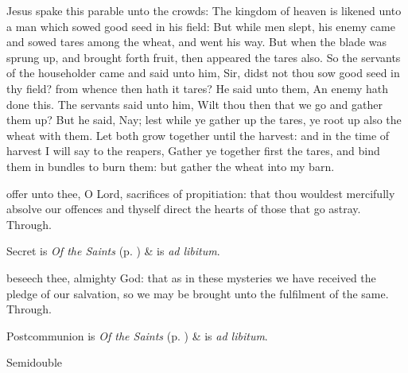 


 Jesus spake this parable unto the crowds: The kingdom of heaven is likened unto a man which sowed good seed in his field: But while men slept, his enemy came and sowed tares among the wheat, and went his way. But when the blade was sprung up, and brought forth fruit, then appeared the tares also. So the servants of the householder came and said unto him, Sir, didst not thou sow good seed in thy field? from whence then hath it tares? He said unto them, An enemy hath done this. The servants said unto him, Wilt thou then that we go and gather them up? But he said, Nay; lest while ye gather up the tares, ye root up also the wheat with them. Let both grow together until the harvest: and in the time of harvest I will say to the reapers, Gather ye together first the tares, and bind them in bundles to burn them: but gather the wheat into my barn.

\secret\label{EpiphanyVSecret}
 offer unto thee, O Lord, sacrifices of propitiation: that thou wouldest mercifully absolve our offences and thyself direct the hearts of those that go astray. Through.
\begin{rubric}
     Secret is \emph{Of the Saints} (p. \pageref{SPSaints}) \&  is \emph{ad libitum}.
\end{rubric}
\postcommunion\label{EpiphanyVPostcommunion}
 beseech thee, almighty God: that as in these mysteries we have received the pledge of our salvation, so we may be brought unto the fulfilment of the same. Through.
\begin{rubric}
     Postcommunion is \emph{Of the Saints} (p. \pageref{SPSaints}) \&  is \emph{ad libitum}.
\end{rubric}


\begin{inhead}
{Semidouble}
\end{inhead}

